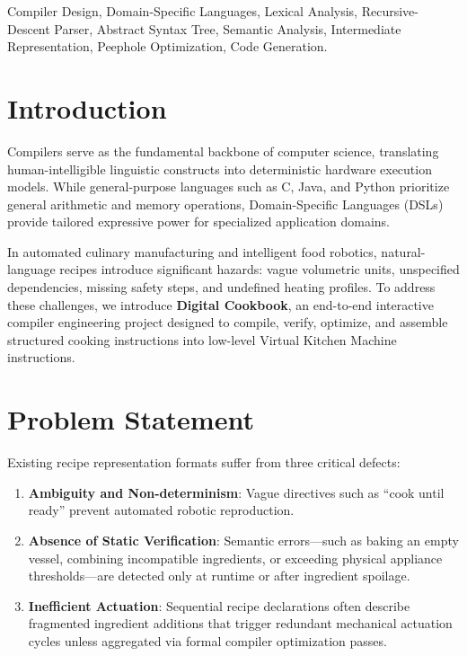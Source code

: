 \documentclass[conference]{IEEEtran}
\begin{document}
\begin{IEEEkeywords}
Compiler Design, Domain-Specific Languages, Lexical Analysis, Recursive-Descent Parser, Abstract Syntax Tree, Semantic Analysis, Intermediate Representation, Peephole Optimization, Code Generation.
\end{IEEEkeywords}

\section{Introduction}
Compilers serve as the fundamental backbone of computer science, translating human-intelligible linguistic constructs into deterministic hardware execution models. While general-purpose languages such as C, Java, and Python prioritize general arithmetic and memory operations, Domain-Specific Languages (DSLs) provide tailored expressive power for specialized application domains. 

In automated culinary manufacturing and intelligent food robotics, natural-language recipes introduce significant hazards: vague volumetric units, unspecified dependencies, missing safety steps, and undefined heating profiles. To address these challenges, we introduce \textbf{Digital Cookbook}, an end-to-end interactive compiler engineering project designed to compile, verify, optimize, and assemble structured cooking instructions into low-level Virtual Kitchen Machine instructions.

\section{Problem Statement}
Existing recipe representation formats suffer from three critical defects:
\begin{enumerate}
    \item \textbf{Ambiguity and Non-determinism}: Vague directives such as ``cook until ready'' prevent automated robotic reproduction.
    \item \textbf{Absence of Static Verification}: Semantic errors—such as baking an empty vessel, combining incompatible ingredients, or exceeding physical appliance thresholds—are detected only at runtime or after ingredient spoilage.
    \item \textbf{Inefficient Actuation}: Sequential recipe declarations often describe fragmented ingredient additions that trigger redundant mechanical actuation cycles unless aggregated via formal compiler optimization passes.
\end{enumerate}
\end{document}
